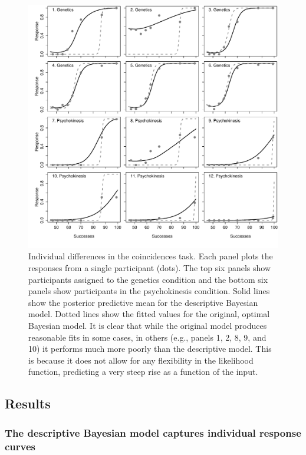 \documentclass[doc,floatsintext]{apa6}
\begin{document}
\begin{figure}[p]
	\centering
	\includegraphics[width=1\textwidth]{coincidences_figures/individuals.pdf}
	\caption{Individual differences in the coincidences task. Each panel plots the responses from a single participant (dots). The top six panels show participants assigned to the {\sc genetics} condition and the bottom six panels show participants in the {\sc psychokinesis} condition.
Solid lines show the posterior predictive mean for the descriptive Bayesian model. Dotted lines show the fitted values for the original, optimal Bayesian model. It is clear that while the original model produces reasonable fits in some cases, in others (e.g., panels 1, 2, 8, 9, and 10) it performs much more poorly than the descriptive model. This is because it does not allow for any flexibility in the likelihood function, predicting a very steep rise as a function of the input.}
	\label{fig:indiv}
\end{figure}


\subsection*{Results}

\subsubsection*{The descriptive Bayesian model captures individual response curves}
\end{document}
